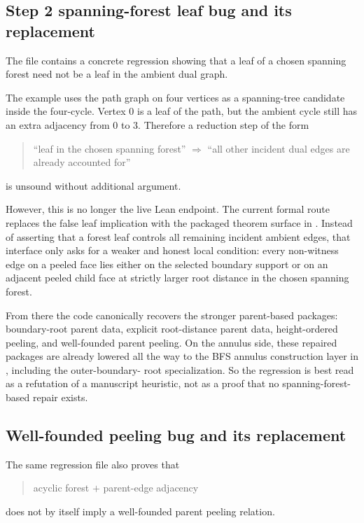 \documentclass[11pt]{article}
\begin{document}
\subsection{Step 2 spanning-forest leaf bug and its replacement}

The file
contains a concrete regression showing that a leaf of a chosen spanning forest
need not be a leaf in the ambient dual graph.

The example uses the path graph on four vertices as a spanning-tree candidate
inside the four-cycle.  Vertex \(0\) is a leaf of the path, but the ambient
cycle still has an extra adjacency from \(0\) to \(3\).  Therefore a reduction
step of the form
\begin{quote}
``leaf in the chosen spanning forest'' \(\Rightarrow\) ``all other incident dual
edges are already accounted for''
\end{quote}
is unsound without additional argument.

However, this is no longer the live Lean endpoint.  The current formal route
replaces the false leaf implication with the packaged theorem surface
 in
.  Instead of asserting that a forest
leaf controls all remaining incident ambient edges, that interface only asks
for a weaker and honest local condition: every non-witness edge on a peeled
face lies either on the selected boundary support or on an adjacent peeled
child face at strictly larger root distance in the chosen spanning forest.

From there the code canonically recovers the stronger parent-based packages:
boundary-root parent data, explicit root-distance parent data, height-ordered
peeling, and well-founded parent peeling.  On the annulus side, these repaired
packages are already lowered all the way to the BFS annulus construction layer
in , including the outer-boundary-
root specialization.  So the regression is best read as a refutation of a
manuscript heuristic, not as a proof that no spanning-forest-based repair
exists.

\subsection{Well-founded peeling bug and its replacement}

The same regression file also proves that
\begin{quote}
acyclic forest \(+\) parent-edge adjacency
\end{quote}
does not by itself imply a well-founded parent peeling relation.
\end{document}
